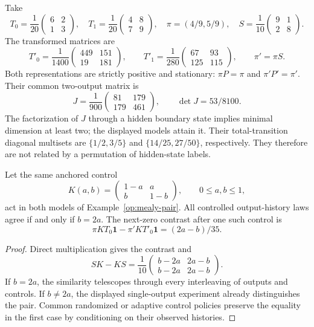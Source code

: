 \begin{example}
\label{op:mealy-pair}
Take
\[
 T_0=\frac1{20}\begin{pmatrix}6&2\\1&3\end{pmatrix},\quad
 T_1=\frac1{20}\begin{pmatrix}4&8\\7&9\end{pmatrix},\quad
 \pi=(4/9,5/9),\quad
 S=\frac1{10}\begin{pmatrix}9&1\\2&8\end{pmatrix}.
\]
The transformed matrices are
\[
 T'_0=\frac1{1400}\begin{pmatrix}449&151\\19&181\end{pmatrix},
 \qquad
 T'_1=\frac1{280}\begin{pmatrix}67&93\\125&115\end{pmatrix},
 \qquad \pi'=\pi S .
\]
Both representations are strictly positive and stationary:
\(\pi P=\pi\) and \(\pi'P'=\pi'\).
Their common two-output matrix is
\[
 J=\frac1{900}\begin{pmatrix}81&179\\179&461\end{pmatrix},
 \qquad \det J=53/8100.
\]
The factorization of \(J\) through a hidden boundary state implies
minimal dimension at least two; the displayed models attain it.
Their total-transition diagonal multisets are
\(\{1/2,3/5\}\) and \(\{14/25,27/50\}\), respectively.
They therefore are not related by a permutation of hidden-state labels.
\end{example}

\begin{proposition}
\label{op:pair-control}
Let the same anchored control
\[
 K(a,b)=\begin{pmatrix}1-a&a\\b&1-b\end{pmatrix},
 \qquad 0\le a,b\le1,
\]
act in both models of Example~\ref{op:mealy-pair}.
All controlled output-history laws agree if and only if \(b=2a\).
The next-zero contrast after one such control is
\[
 \pi KT_0\mathbf1-\pi'KT'_0\mathbf1=(2a-b)/35.
\]
\end{proposition}
\begin{proof}
Direct multiplication gives the contrast and
\[
 SK-KS=\frac1{10}
 \begin{pmatrix}b-2a&2a-b\\b-2a&2a-b\end{pmatrix}.
\]
If \(b=2a\), the similarity telescopes through every interleaving
of outputs and controls.  If \(b\ne2a\), the displayed single-output
experiment already distinguishes the pair.  Common randomized or
adaptive control policies preserve the equality in the first case by
conditioning on their observed histories.
\end{proof}

